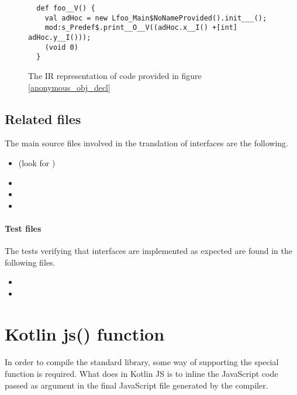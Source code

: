 \begin{figure}[h]
  \begin{verbatim}
  def foo__V() {
    val adHoc = new Lfoo_Main$NoNameProvided().init___();
    mod:s_Predef$.print__O__V((adHoc.x__I() +[int] adHoc.y__I()));
    (void 0)
  }
  \end{verbatim}
  \caption{The IR representation of code provided in figure \ref{anonymous_obj_decl}}
  \label{anonymous_obj_ir}
\end{figure}


\subsection{Related files} The main source files involved in the translation of interfaces are 
the following.

\begin{itemize}
 \item {} (look for )
 \item {}
 \item {}
 \item {}
\end{itemize}

\paragraph{Test files} The tests verifying that interfaces are implemented as expected are 
found in the following files.

\begin{itemize}
 \item {}
 \item {}
\end{itemize}

\section{Kotlin js() function}

\paragraph{} In order to compile the standard library, some way of supporting the special 
 function is required. What  does in Kotlin JS is to 
inline the JavaScript code passed as argument in the final JavaScript file generated by the 
compiler.

